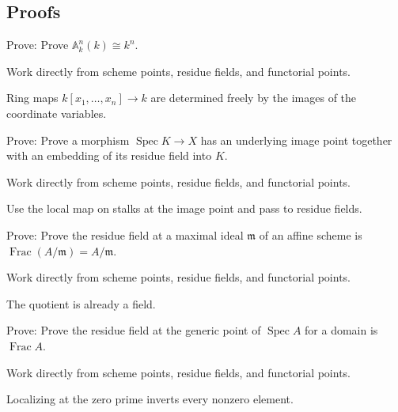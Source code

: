 \subsection*{Proofs}

\begin{exercise}\label{exr:vi21-expand-06}
Prove: Prove $\mathbb A^n_k(k)\cong k^n$.
\end{exercise}
\begin{hint}
Work directly from scheme points, residue fields, and functorial points.
\end{hint}
\begin{solution}
Ring maps $k[x_1,\ldots,x_n]\to k$ are determined freely by the images of the coordinate variables.
\end{solution}

\begin{exercise}\label{exr:vi21-expand-07}
Prove: Prove a morphism $\operatorname{Spec}K\to X$ has an underlying image point together with an embedding of its residue field into $K$.
\end{exercise}
\begin{hint}
Work directly from scheme points, residue fields, and functorial points.
\end{hint}
\begin{solution}
Use the local map on stalks at the image point and pass to residue fields.
\end{solution}

\begin{exercise}\label{exr:vi21-expand-08}
Prove: Prove the residue field at a maximal ideal $\mathfrak m$ of an affine scheme is $\operatorname{Frac}(A/\mathfrak m)=A/\mathfrak m$.
\end{exercise}
\begin{hint}
Work directly from scheme points, residue fields, and functorial points.
\end{hint}
\begin{solution}
The quotient is already a field.
\end{solution}

\begin{exercise}\label{exr:vi21-expand-09}
Prove: Prove the residue field at the generic point of $\operatorname{Spec}A$ for a domain is $\operatorname{Frac}A$.
\end{exercise}
\begin{hint}
Work directly from scheme points, residue fields, and functorial points.
\end{hint}
\begin{solution}
Localizing at the zero prime inverts every nonzero element.
\end{solution}


